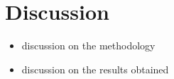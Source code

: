 \chapter{Discussion}

\begin{itemize}
	\item discussion on the methodology
	\item discussion on the results obtained
\end{itemize}
